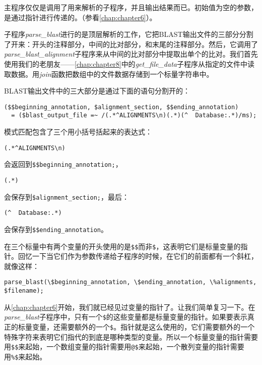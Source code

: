 

主程序仅仅是调用了用来解析的子程序，并且输出结果而已。初始值为空的参数，是通过指针进行传递的。（参看\autoref{chap:chapter6}）。

子程序\textit{parse\_blast}进行的是顶层解析的工作，它把BLAST输出文件的三部分分割了开来：开头的注释部分，中间的比对部分，和末尾的注释部分。然后，它调用了\textit{parse\_blast\_alignment}子程序来从中间的比对部分中提取出单个的比对。我们首先使用我们的老朋友——\autoref{chap:chapter8}中的\textit{get\_file\_data}子程序从指定的文件中读取数据。用\textit{join}函数把数组中的文件数据存储到一个标量字符串中。

BLAST输出文件中的三大部分是通过下面的语句分割开的：

\begin{lstlisting}
($$beginning_annotation, $alignment_section, $$ending_annotation)
  = ($blast_output_file =~ /(.*^ALIGNMENTS\n)(.*)(^  Database:.*)/ms);
\end{lstlisting}

模式匹配包含了三个用小括号括起来的表达式：

\begin{lstlisting}
(.*^ALIGNMENTS\n) 
\end{lstlisting}

会返回到\verb|$$beginning_annotation;|，

\begin{lstlisting}
(.*) 
\end{lstlisting}

会保存到\verb|$alignment_section;|，最后：

\begin{lstlisting}
(^  Database:.*) 
\end{lstlisting}

会保存到\verb|$$ending_annotation|。

在三个标量中有两个变量的开头使用的是\verb|$$|而非\verb|$|，这表明它们是标量变量的指针。回忆一下当它们作为参数传递给子程序的时候，在它们的前面都有一个斜杠，就像这样：

\begin{lstlisting}
parse_blast(\$beginning_annotation, \$ending_annotation, \%alignments, $filename);
\end{lstlisting}

从\autoref{chap:chapter6}开始，我们就已经见过变量的指针了。让我们简单复习一下。在\textit{parse\_blast}子程序中，只有一个\verb|$|的这些变量都是标量变量的指针。如果要表示真正的标量变量，还需要额外的一个\verb|$|。指针就是这么使用的，它们需要额外的一个特殊字符来表明它们指代的到底是哪种类型的变量。所以一个标量变量的指针需要用\verb|$$|来起始，一个数组变量的指针需要用\verb|@$|来起始，一个散列变量的指针需要用\verb|%$|来起始。

